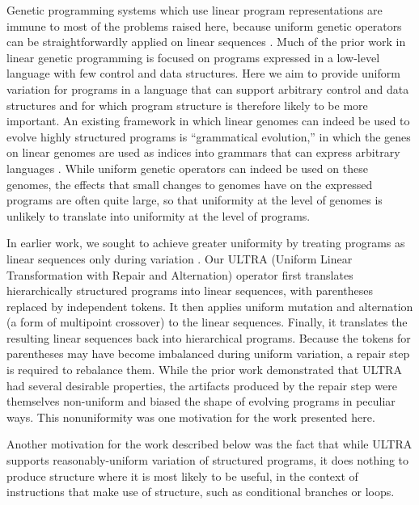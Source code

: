 \documentclass[graybox]{svmult}
\begin{document}
Genetic programming systems which use linear program representations are immune to most of the problems raised here, because uniform genetic operators can be straightforwardly applied on linear sequences \cite{journals/ijait/OlteanGDM09}. Much of the prior work in linear genetic programming is focused on programs expressed in a low-level language with few control and data structures. Here we aim to provide uniform variation for programs in a language that can support arbitrary control and data structures and for which program structure is therefore likely to be more important. An existing framework in which linear genomes can indeed be used to evolve highly structured programs is ``grammatical evolution,'' in which the genes on linear genomes are used as indices into grammars that can express arbitrary languages \cite{ryan:1998:geepal}. While uniform genetic operators can indeed be used on these genomes, the effects that small changes to genomes have on the expressed programs are often quite large, so that uniformity at the level of genomes is unlikely to translate into uniformity at the level of programs.

In earlier work, we sought to achieve greater uniformity by treating programs as linear sequences only during variation \cite{Spector:2013:GPTP}. Our ULTRA (Uniform Linear Transformation with Repair and Alternation) operator first translates hierarchically structured programs into linear sequences, with parentheses replaced by independent tokens. It then applies uniform mutation and alternation (a form of multipoint crossover) to the linear sequences. Finally, it translates the resulting linear sequences back into hierarchical programs. Because the tokens for parentheses may have become imbalanced during uniform variation, a repair step is required to rebalance them. While the prior work demonstrated that ULTRA had several desirable properties, the artifacts produced by the repair step were themselves non-uniform and biased the shape of evolving programs in peculiar ways. This nonuniformity was one motivation for the work presented here.

Another motivation for the work described below was the fact that while ULTRA supports reasonably-uniform variation of structured programs, it does nothing to produce structure where it is most likely to be useful, in the context of instructions that make use of structure, such as conditional branches or loops.
\end{document}
